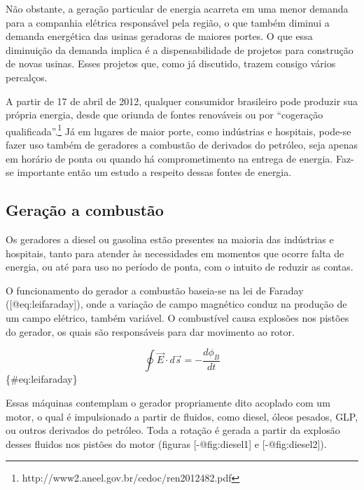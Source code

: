 \documentclass[
]{article}
\begin{document}
Não obstante, a geração particular de energia acarreta em uma menor
demanda para a companhia elétrica responsável pela região, o que também
diminui a demanda energética das usinas geradoras de maiores portes. O
que essa diminuição da demanda implica é a dispensabilidade de projetos
para construção de novas usinas. Esses projetos que, como já discutido,
trazem consigo vários percalços.

A partir de 17 de abril de 2012, qualquer consumidor brasileiro pode
produzir sua própria energia, desde que oriunda de fontes renováveis ou
por ``cogeração qualificada''.\footnote{http://www2.aneel.gov.br/cedoc/ren2012482.pdf}
Já em lugares de maior porte, como indústrias e hospitais, pode-se fazer
uso também de geradores a combustão de derivados do petróleo, seja
apenas em horário de ponta ou quando há comprometimento na entrega de
energia. Faz-se importante então um estudo a respeito dessas fontes de
energia.

\hypertarget{gerauxe7uxe3o-a-combustuxe3o}{%
\subsection{Geração a combustão}\label{gerauxe7uxe3o-a-combustuxe3o}}

Os geradores a diesel ou gasolina estão presentes na maioria das
indústrias e hospitais, tanto para atender às necessidades em momentos
que ocorre falta de energia, ou até para uso no período de ponta, com o
intuito de reduzir as contas.

O funcionamento do gerador a combustão baseia-se na lei de Faraday
({[}@eq:leifaraday{]}), onde a variação de campo magnético conduz na
produção de um campo elétrico, também variável. O combustível causa
explosões nos pistões do gerador, os quais são responsáveis para dar
movimento ao rotor.

\[ \oint \vec{E} \cdot d\vec{s} = -\frac{d\phi_B}{dt} \]\{\#eq:leifaraday\}

Essas máquinas contemplam o gerador propriamente dito acoplado com um
motor, o qual é impulsionado a partir de fluidos, como diesel, óleos
pesados, GLP, ou outros derivados do petróleo. Toda a rotação é gerada a
partir da explosão desses fluidos nos pistões do motor (figuras
{[}-@fig:diesel1{]} e {[}-@fig:diesel2{]}).
\end{document}
